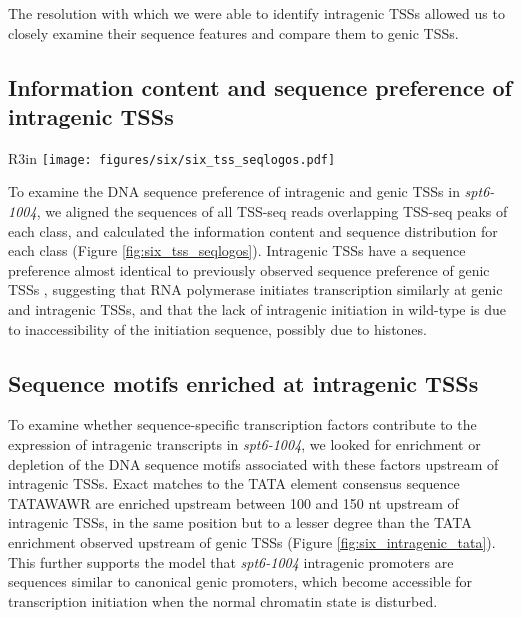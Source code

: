 The resolution with which we were able to identify intragenic TSSs allowed us to closely examine their sequence features and compare them to genic TSSs.

\subsection{Information content and sequence preference of intragenic TSSs}

\begin{wrapfigure}[13]{R}{3in}
\centering
\texttt{[image: figures/six/six\_tss\_seqlogos.pdf]}
\caption[Sequence logos of TSS-seq reads overlapping genic and intragenic TSS-seq peaks in \textit{spt6-1004}.]{Sequence logos depicting information content and sequence preference of TSS-seq reads overlapping genic and intragenic TSS-seq peaks in \textit{spt6-1004}.}
\label{fig:six_tss_seqlogos}
\end{wrapfigure}

To examine the DNA sequence preference of intragenic and genic TSSs in \textit{spt6-1004}, we aligned the sequences of all TSS-seq reads overlapping TSS-seq peaks of each class, and calculated the information content and sequence distribution for each class (Figure \ref{fig:six_tss_seqlogos}).
Intragenic TSSs have a sequence preference almost identical to previously observed sequence preference of genic TSSs \citep{malabat2015}, suggesting that RNA polymerase initiates transcription similarly at genic and intragenic TSSs, and that the lack of intragenic initiation in wild-type is due to inaccessibility of the initiation sequence, possibly due to histones.

\subsection{Sequence motifs enriched at intragenic TSSs}

To examine whether sequence-specific transcription factors contribute to the expression of intragenic transcripts in \textit{spt6-1004}, we looked for enrichment or depletion of the DNA sequence motifs associated with these factors upstream of intragenic TSSs.
Exact matches to the TATA element consensus sequence TATAWAWR are enriched upstream between 100 and 150 nt upstream of intragenic TSSs, in the same position but to a lesser degree than the TATA enrichment observed upstream of genic TSSs (Figure \ref{fig:six_intragenic_tata}).
This further supports the model that \textit{spt6-1004} intragenic promoters are sequences similar to canonical genic promoters, which become accessible for transcription initiation when the normal chromatin state is disturbed.

